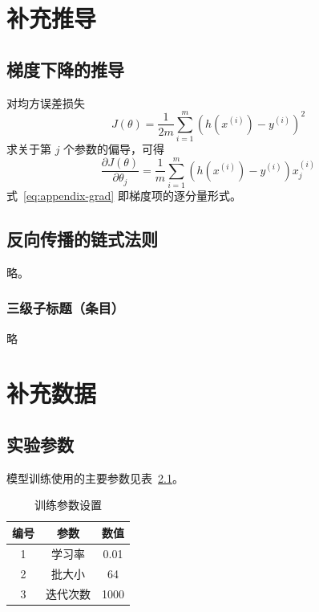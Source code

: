\appendix

\chapter{补充推导}

\section{梯度下降的推导}
\label{app:gd}

对均方误差损失
\begin{equation}
  J(\theta) = \frac{1}{2m}\sum_{i=1}^{m}\left(h(x^{(i)}) - y^{(i)}\right)^2
  \label{eq:appendix-mse}
\end{equation}
求关于第 $j$ 个参数的偏导，可得
\begin{equation}
  \frac{\partial J(\theta)}{\partial \theta_j}
  = \frac{1}{m} \sum_{i=1}^{m}
    \left( h(x^{(i)}) - y^{(i)} \right) x_j^{(i)}
  \label{eq:appendix-grad}
\end{equation}
式~\ref{eq:appendix-grad} 即梯度项的逐分量形式。

\section{反向传播的链式法则}

略。

\subsection{三级子标题（条目）}

略

\chapter{补充数据}

\section{实验参数}

模型训练使用的主要参数见表~\ref{tab:appendix-params}。

\begin{table}[htbp]
  \centering
  \caption{训练参数设置}
  \label{tab:appendix-params}
  \begin{tabular}{ccc}
    \hline
    编号 & 参数 & 数值 \\
    \hline
    1 & 学习率   & 0.01 \\
    2 & 批大小   & 64   \\
    3 & 迭代次数 & 1000 \\
    \hline
  \end{tabular}
\end{table}

